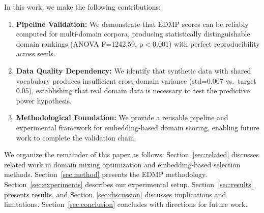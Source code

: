 In this work, we make the following contributions:

\begin{enumerate}
    \item \textbf{Pipeline Validation:} We demonstrate that EDMP scores can be reliably computed for multi-domain corpora, producing statistically distinguishable domain rankings (ANOVA F=1242.59, p$<$0.001) with perfect reproducibility across seeds.

    \item \textbf{Data Quality Dependency:} We identify that synthetic data with shared vocabulary produces insufficient cross-domain variance (std=0.007 vs.\ target 0.05), establishing that real domain data is necessary to test the predictive power hypothesis.

    \item \textbf{Methodological Foundation:} We provide a reusable pipeline and experimental framework for embedding-based domain scoring, enabling future work to complete the validation chain.
\end{enumerate}

We organize the remainder of this paper as follows: Section~\ref{sec:related} discusses related work in domain mixing optimization and embedding-based selection methods. Section~\ref{sec:method} presents the EDMP methodology. Section~\ref{sec:experiments} describes our experimental setup. Section~\ref{sec:results} presents results, and Section~\ref{sec:discussion} discusses implications and limitations. Section~\ref{sec:conclusion} concludes with directions for future work.
